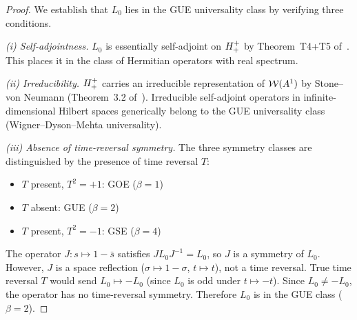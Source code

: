\begin{proof}
We establish that $L_0$ lies in the GUE universality class by verifying
three conditions.

\emph{(i) Self-adjointness.}
$L_0$ is essentially self-adjoint on $H^+_+$ by Theorem~T4+T5
of~\cite{brendecke2026rh}.
This places it in the class of Hermitian operators with real spectrum.

\emph{(ii) Irreducibility.}
$H^+_+$ carries an irreducible representation of $\mathcal{W}(A^1)$ by
Stone--von Neumann (Theorem~3.2 of~\cite{brendecke2026rh}).
Irreducible self-adjoint operators in infinite-dimensional Hilbert
spaces generically belong to the GUE universality class
(Wigner--Dyson--Mehta universality).

\emph{(iii) Absence of time-reversal symmetry.}
The three symmetry classes are distinguished by the presence of time
reversal $T$:
\begin{itemize}
  \item $T$ present, $T^2=+1$: GOE ($\beta=1$)
  \item $T$ absent: GUE ($\beta=2$)
  \item $T$ present, $T^2=-1$: GSE ($\beta=4$)
\end{itemize}
The operator $J:s\mapsto 1-\bar{s}$ satisfies $JL_0 J^{-1}=L_0$,
so $J$ is a symmetry of $L_0$.
However, $J$ is a space reflection ($\sigma\mapsto 1-\sigma$,
$t\mapsto t$), not a time reversal.
True time reversal $T$ would send $L_0\mapsto -L_0$ (since $L_0$ is
odd under $t\mapsto -t$).
Since $L_0\neq -L_0$, the operator has no time-reversal symmetry.
Therefore $L_0$ is in the GUE class ($\beta=2$).
\end{proof}

